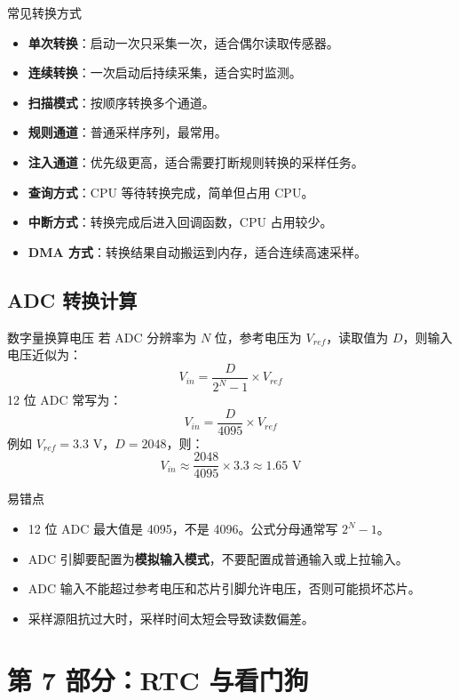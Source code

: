 \documentclass[UTF8,fontset=none,12pt]{ctexart}
\begin{document}
\begin{pointbox}{常见转换方式}
\begin{itemize}
  \item \textbf{单次转换}：启动一次只采集一次，适合偶尔读取传感器。
  \item \textbf{连续转换}：一次启动后持续采集，适合实时监测。
  \item \textbf{扫描模式}：按顺序转换多个通道。
  \item \textbf{规则通道}：普通采样序列，最常用。
  \item \textbf{注入通道}：优先级更高，适合需要打断规则转换的采样任务。
  \item \textbf{查询方式}：CPU 等待转换完成，简单但占用 CPU。
  \item \textbf{中断方式}：转换完成后进入回调函数，CPU 占用较少。
  \item \textbf{DMA 方式}：转换结果自动搬运到内存，适合连续高速采样。
\end{itemize}
\end{pointbox}

\subsection{ADC 转换计算}
\begin{pointbox}{数字量换算电压}
若 ADC 分辨率为 $N$ 位，参考电压为 $V_{ref}$，读取值为 $D$，则输入电压近似为：
\[
  V_{in}=\frac{D}{2^N-1}\times V_{ref}
\]
12 位 ADC 常写为：
\[
  V_{in}=\frac{D}{4095}\times V_{ref}
\]
例如 $V_{ref}=3.3\text{ V}$，$D=2048$，则：
\[
  V_{in}\approx \frac{2048}{4095}\times 3.3\approx 1.65\text{ V}
\]
\end{pointbox}

\begin{warnbox}{易错点}
\begin{itemize}
  \item 12 位 ADC 最大值是 4095，不是 4096。公式分母通常写 $2^N-1$。
  \item ADC 引脚要配置为\textbf{模拟输入模式}，不要配置成普通输入或上拉输入。
  \item ADC 输入不能超过参考电压和芯片引脚允许电压，否则可能损坏芯片。
  \item 采样源阻抗过大时，采样时间太短会导致读数偏差。
\end{itemize}
\end{warnbox}

\section{第 7 部分：RTC 与看门狗}
\end{document}
